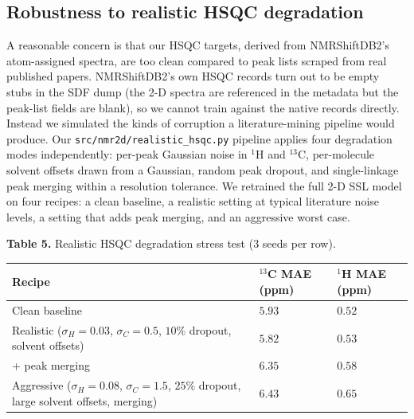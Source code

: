 \documentclass[
  11pt,
  a4paper,
]{article}
\newcounter{none} %
\begin{document}
\subsection*{Robustness to realistic HSQC degradation}

A reasonable concern is that our HSQC targets, derived from
NMRShiftDB2's atom-assigned spectra, are too clean compared to peak
lists scraped from real published papers. NMRShiftDB2's own HSQC
records turn out to be empty stubs in the SDF dump (the 2-D spectra
are referenced in the metadata but the peak-list fields are blank), so
we cannot train against the native records directly. Instead we
simulated the kinds of corruption a literature-mining pipeline would
produce. Our \texttt{src/nmr2d/realistic\_hsqc.py} pipeline applies four
degradation modes independently: per-peak Gaussian noise in \(^{1}\)H
and \(^{13}\)C, per-molecule solvent offsets drawn from a Gaussian,
random peak dropout, and single-linkage peak merging within a
resolution tolerance. We retrained the full 2-D SSL model on four
recipes: a clean baseline, a realistic setting at typical literature
noise levels, a setting that adds peak merging, and an aggressive
worst case.

\textbf{Table 5.} Realistic HSQC degradation stress test (3 seeds per row).

{\def\LTcaptype{none} %
\begin{longtable}[]{@{}
  >{\raggedright\arraybackslash}p{}
  >{\raggedright\arraybackslash}p{}
  >{\raggedright\arraybackslash}p{}@{}}
\toprule\noalign{}
\begin{minipage}[b]{\linewidth}\raggedright
Recipe
\end{minipage} & \begin{minipage}[b]{\linewidth}\raggedright
\(^{13}\)C MAE (ppm)
\end{minipage} & \begin{minipage}[b]{\linewidth}\raggedright
\(^{1}\)H MAE (ppm)
\end{minipage} \\
\midrule\noalign{}
\endhead
\bottomrule\noalign{}
\endlastfoot
Clean baseline & \(5.93\) & \(0.52\) \\
Realistic (\(\sigma_H=0.03\), \(\sigma_C=0.5\), \(10\%\) dropout, solvent offsets) & \(5.82\) & \(0.53\) \\
+ peak merging & \(6.35\) & \(0.58\) \\
Aggressive (\(\sigma_H=0.08\), \(\sigma_C=1.5\), \(25\%\) dropout, large solvent offsets, merging) & \(6.43\) & \(0.65\) \\
\end{longtable}
}
\end{document}
